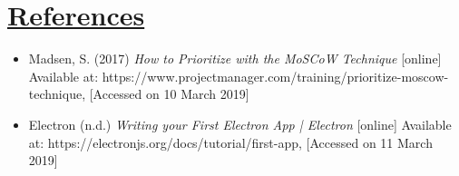 \documentclass{article}
\begin{document}
\section{\underline{References}}
\begin{itemize}
\item Madsen, S. (2017) \textit{How to Prioritize with the MoSCoW Technique} [online] Available at: https://www.projectmanager.com/training/prioritize-moscow-technique, [Accessed on 10 March 2019]
\item Electron (n.d.) \textit{Writing your First Electron App | Electron} [online] Available at: https://electronjs.org/docs/tutorial/first-app, [Accessed on 11 March 2019]
\end{itemize}
\end{document}
